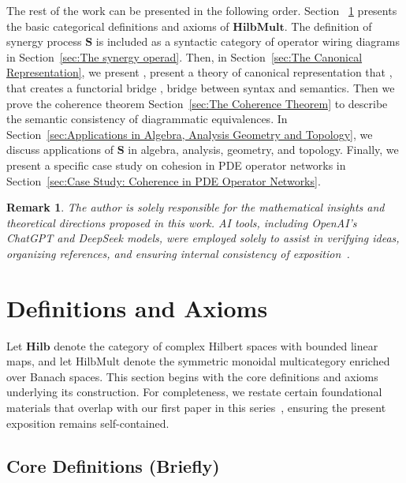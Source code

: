 \documentclass[11pt]{article}
\newcommand{\HilbMult}{\mathrm{HilbMult}}
\newtheorem{remark}{Remark}
\begin{document}
The rest of the work can be presented in the following order. Section ~\ref{sec:Definitions and Axioms} presents the basic categorical definitions and axioms of $\mathbf{HilbMult}$. The definition of synergy process $\mathbf{S}$ is included as a syntactic category of operator wiring diagrams in Section~\ref{sec:The synergy operad}. Then, in Section~\ref{sec:The Canonical Representation}, we present , present a theory of  canonical representation that , that creates a functorial bridge , bridge between syntax and semantics. Then we prove the coherence theorem Section~\ref{sec:The Coherence Theorem} to describe the semantic consistency of diagrammatic equivalences.  In Section~\ref{sec:Applications in Algebra, Analysis Geometry and Topology}, we discuss  applications of $\mathbf{S}$ in algebra, analysis, geometry, and topology. Finally, we present a specific case study on cohesion in PDE operator networks in Section~\ref{sec:Case Study: Coherence in PDE Operator Networks}.

\begin{remark}
The author is solely responsible for the mathematical insights and theoretical directions proposed in this work. AI tools, including OpenAI's ChatGPT and DeepSeek models, were employed solely to assist in verifying ideas, organizing references, and ensuring internal consistency of exposition~\cite{chatgpt2025,deepseek2025}.
\end{remark}






\section{Definitions and Axioms}\label{sec:Definitions and Axioms}

Let $\mathbf{Hilb}$ denote the category of complex Hilbert spaces with bounded linear maps, and let $\HilbMult$ denote the symmetric monoidal multicategory enriched over Banach spaces. This section begins with the core definitions and axioms underlying its construction. For completeness, we restate certain foundational materials that overlap with our first paper in this series~\cite{Chang2025HilbMultABranchE}, ensuring the present exposition remains self-contained.


\subsection{Core Definitions (Briefly)}
\end{document}
